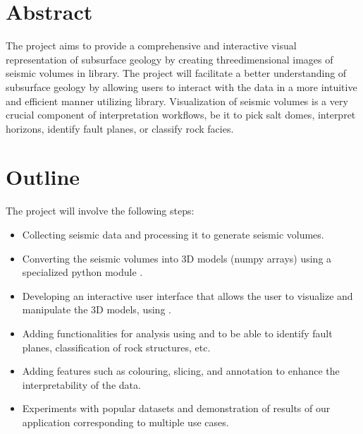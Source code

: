 \documentclass[letterpaper,10pt,english]{sphinxmanual}
\begin{document}
\chapter{Abstract}
\label{\detokenize{index:abstract}}
\sphinxAtStartPar
The project aims to provide a comprehensive and interactive visual
representation of subsurface geology by creating three\sphinxhyphen{}dimensional
images of seismic volumes in  library. The project will
facilitate a better understanding of subsurface geology by allowing
users to interact with the data in a more intuitive and efficient manner
utilizing  library. Visualization of seismic volumes is a
very crucial component of interpretation workflows, be it to pick salt
domes, interpret horizons, identify fault planes, or classify rock
facies.


\chapter{Outline}
\label{\detokenize{index:outline}}
\sphinxAtStartPar
The project will involve the following steps:
\begin{itemize}
\item {} 
\sphinxAtStartPar
Collecting seismic data and processing it to generate seismic
volumes.

\item {} 
\sphinxAtStartPar
Converting the seismic volumes into 3D models (numpy arrays) using a
specialized python module .

\item {} 
\sphinxAtStartPar
Developing an interactive user interface that allows the user to
visualize and manipulate the 3D models, using .

\item {} 
\sphinxAtStartPar
Adding functionalities for analysis using  and 
to be able to identify fault planes, classification of rock
structures, etc.

\item {} 
\sphinxAtStartPar
Adding features such as colouring, slicing, and annotation to enhance
the interpretability of the data.

\item {} 
\sphinxAtStartPar
Experiments with popular datasets and demonstration of results of our
application corresponding to multiple use cases.

\end{itemize}
\end{document}
